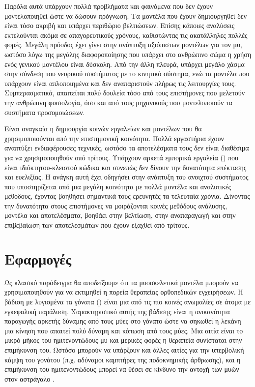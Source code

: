 Παρόλα αυτά υπάρχουν πολλά προβλήματα και φαινόμενα που δεν έχουν μοντελοποιηθεί ώστε να δώσουν πρόγνωση. Τα μοντέλα που έχουν δημιουργηθεί δεν είναι τόσο ακριβή και υπάρχει περιθώριο βελτιώσεων. Επίσης κάποιες αναλύσεις εκτελούνται ακόμα σε απαγορευτικούς χρόνους, καθιστώντας τις ακατάλληλες πολλές φορές. Μεγάλη πρόοδος έχει γίνει στην ανάπτυξη αξιόπιστων μοντέλων για τον μυ, ωστόσο λόγω της μεγάλης διαφοροποίησης που υπάρχει στο ανθρώπινο σώμα η χρήση ενός γενικού μοντέλου είναι δύσκολη. Από την άλλη πλευρά, υπάρχει μεγάλο χάσμα στην σύνδεση του νευρικού συστήματος με το κινητικό σύστημα, ενώ τα μοντέλα που υπάρχουν είναι απλοποιημένα και δεν αναπαριστούν πλήρως τις λειτουργίες τους. Συμπερασματικά, απαιτείται πολύ δουλεία τόσο από τους επιστήμονες που μελετούν την ανθρώπινη φυσιολογία, όσο και από τους μηχανικούς που μοντελοποιούν τα συστήματα προσομοιώσεων.

Είναι αναγκαία η δημιουργία κοινών εργαλείων και μοντέλων που θα χρησιμοποιούνται από την επιστημονική κοινότητα. Πολλά εργαστήρια έχουν αναπτύξει ενδιαφέρουσες τεχνικές, ωστόσο τα αποτελέσματα τους δεν είναι διαθέσιμα για να χρησιμοποιηθούν από τρίτους. Υπάρχουν αρκετά εμπορικά εργαλεία () που είναι ιδιόκτητου-κλειστού κώδικα και συνεπώς δεν δίνουν την δυνατότητα επέκτασης και ευελιξίας. Η ανάγκη αυτή έχει οδηγήσει στην ανάπτυξη του ανοιχτού συστήματος  που υποστηρίζεται από μια μεγάλη κοινότητα με πολλά μοντέλα και αναλυτικές μεθόδους, έχοντας βοηθήσει σημαντικά τους ερευνητές τα τελευταία χρόνια. Δίνοντας την δυνατότητα στους επιστήμονες να μοιράζονται κοινές μεθόδους ανάλυσης, μοντέλα και αποτελέσματα, βοηθάει στην βελτίωση, στην αναπαραγωγή και στην επιβεβαίωση των αποτελεσμάτων που έχουν εξαχθεί από τρίτους.

\section{Εφαρμογές}

Ως κλασικό παράδειγμα θα αποδείξουμε ότι τα μυοσκελετικά μοντέλα μπορούν να χρησιμοποιηθούν για να εκτιμηθεί η πορεία θεραπείας ορθοπεδικών εγχειρήσεων. Η βάδιση με λυγισμένα τα γόνατα () είναι μια από τις πιο κοινές ανωμαλίες σε άτομα με εγκεφαλική παράλυση. Χαρακτηριστικό αυτής της βάδισης είναι η ανικανότητα παραγωγής αρκετής δύναμης από τους μύες στο γόνατο ώστε να σηκωθεί η λεκάνη μια κίνηση που απαιτεί πολύ δύναμη και κόπωση από τους μύες.  Μια αιτία είναι το μικρό μήκος του ημιτενοντώδους μυ και μερικές φορές η θεραπεία συνίσταται στην επιμήκυνση του. Ωστόσο μπορούν να υπάρξουν και άλλες αιτίες για την υπερβολική κάμψη του γονάτου (π.χ. αδύναμοι καμπτήρες της ποδοκνημικής άρθρωσης), και η επιμήκυνση του ημιτενοντώδους μπορεί να θέσει σε κίνδυνο την αντοχή των μυών στον αστράγαλο \cite{arnolda06}.

